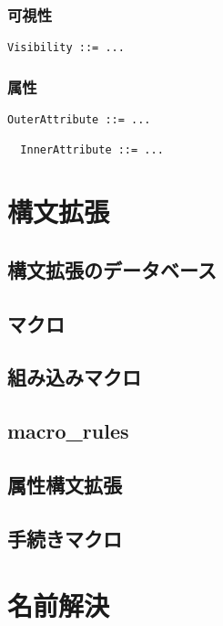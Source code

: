 \documentclass[dvipdfmx,uplatex,papersize,a4paper,10pt]{jsbook}
\theoremstyle{definition}
\begin{document}
\subsection{可視性}

\begin{lstlisting}[language=BNFLike, gobble=2]
  Visibility ::= ...
\end{lstlisting}

\subsection{属性}

\begin{lstlisting}[language=BNFLike, gobble=2]
  OuterAttribute ::= ...

  InnerAttribute ::= ...
\end{lstlisting}



\chapter{構文拡張}

\section{構文拡張のデータベース}

\section{マクロ}

\section{組み込みマクロ}

\section{macro\_rules}

\section{属性構文拡張}

\section{手続きマクロ}



\chapter{名前解決}
\end{document}
